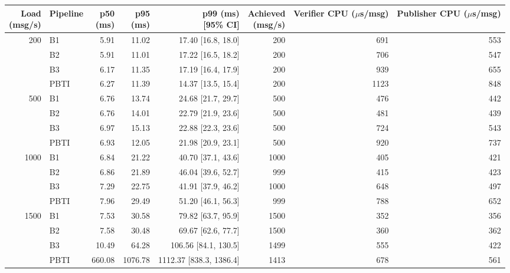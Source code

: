 \begin{tabular}{rlrrrrrr}
\toprule
\makecell[r]{Load\\(msg/s)} & Pipeline & \makecell[r]{p50\\(ms)} & \makecell[r]{p95\\(ms)} & \makecell[r]{p99 (ms)\\{[95\% CI]}} & \makecell[r]{Achieved\\(msg/s)} & \makecell[r]{Verifier CPU\\($\mu$s/msg)} & \makecell[r]{Publisher CPU\\($\mu$s/msg)}\\
\midrule
200 & B1 & 5.91 & 11.02 & 17.40 [16.8, 18.0] & 200 & 691 & 553\\
 & B2 & 5.91 & 11.01 & 17.22 [16.5, 18.2] & 200 & 706 & 547\\
 & B3 & 6.17 & 11.35 & 17.19 [16.4, 17.9] & 200 & 939 & 655\\
 & PBTI & 6.27 & 11.39 & 14.37 [13.5, 15.4] & 200 & 1123 & 848\\
\midrule
500 & B1 & 6.76 & 13.74 & 24.68 [21.7, 29.7] & 500 & 476 & 442\\
 & B2 & 6.76 & 14.01 & 22.79 [21.9, 23.6] & 500 & 481 & 439\\
 & B3 & 6.97 & 15.13 & 22.88 [22.3, 23.6] & 500 & 724 & 543\\
 & PBTI & 6.93 & 12.05 & 21.98 [20.9, 23.1] & 500 & 920 & 737\\
\midrule
1000 & B1 & 6.84 & 21.22 & 40.70 [37.1, 43.6] & 1000 & 405 & 421\\
 & B2 & 6.86 & 21.89 & 46.04 [39.6, 52.7] & 999 & 415 & 423\\
 & B3 & 7.29 & 22.75 & 41.91 [37.9, 46.2] & 1000 & 648 & 497\\
 & PBTI & 7.96 & 29.49 & 51.20 [46.1, 56.3] & 999 & 788 & 652\\
\midrule
1500 & B1 & 7.53 & 30.58 & 79.82 [63.7, 95.9] & 1500 & 352 & 356\\
 & B2 & 7.58 & 30.48 & 69.67 [62.6, 77.7] & 1500 & 360 & 362\\
 & B3 & 10.49 & 64.28 & 106.56 [84.1, 130.5] & 1499 & 555 & 422\\
 & PBTI & 660.08 & 1076.78 & 1112.37 [838.3, 1386.4] & 1413 & 678 & 561\\
\bottomrule
\end{tabular}